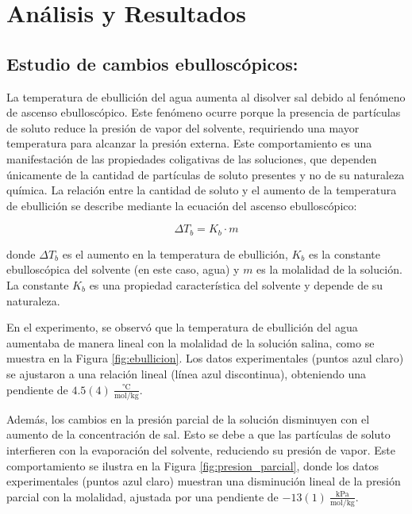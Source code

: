 \documentclass{article}
\begin{document}
\section{Análisis y Resultados}
\subsection{Estudio de cambios ebulloscópicos:}
La temperatura de ebullición del agua aumenta al disolver sal debido al fenómeno de ascenso ebulloscópico. Este fenómeno ocurre porque la presencia de partículas de soluto reduce la presión de vapor del solvente, requiriendo una mayor temperatura para alcanzar la presión externa. Este comportamiento es una manifestación de las propiedades coligativas de las soluciones, que dependen únicamente de la cantidad de partículas de soluto presentes y no de su naturaleza química. La relación entre la cantidad de soluto y el aumento de la temperatura de ebullición se describe mediante la ecuación del ascenso ebulloscópico:

\[
\Delta T_b = K_b \cdot m
\]

donde $\Delta T_b$ es el aumento en la temperatura de ebullición, $K_b$ es la constante ebulloscópica del solvente (en este caso, agua) y $m$ es la molalidad de la solución. La constante $K_b$ es una propiedad característica del solvente y depende de su naturaleza.

En el experimento, se observó que la temperatura de ebullición del agua aumentaba de manera lineal con la molalidad de la solución salina, como se muestra en la Figura \ref{fig:ebullicion}. Los datos experimentales (puntos azul claro) se ajustaron a una relación lineal (línea azul discontinua), obteniendo una pendiente de $4.5(4) \ \frac{\text{°C}}{\text{mol/kg}}$.

Además, los cambios en la presión parcial de la solución disminuyen con el aumento de la concentración de sal. Esto se debe a que las partículas de soluto interfieren con la evaporación del solvente, reduciendo su presión de vapor. Este comportamiento se ilustra en la Figura \ref{fig:presion_parcial}, donde los datos experimentales (puntos azul claro) muestran una disminución lineal de la presión parcial con la molalidad, ajustada por una pendiente de $-13(1) \ \frac{\text{kPa}}{\text{mol/kg}}$.
\end{document}

